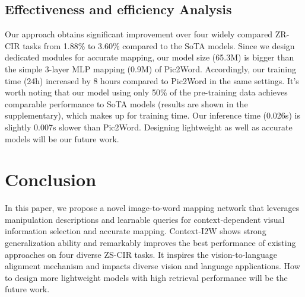 \documentclass[letterpaper]{article} \usepackage{aaai24}  \usepackage{times}  \usepackage{helvet}  \usepackage{courier}  \usepackage[hyphens]{url}  \usepackage{graphicx} \urlstyle{rm} \def\UrlFont{\rm}  \usepackage{natbib}  \usepackage{caption} \frenchspacing  \setlength{\pdfpagewidth}{8.5in} \setlength{\pdfpageheight}{11in} \usepackage{algorithm}
\begin{document}
\subsection{Effectiveness and efficiency Analysis} 
Our approach obtains significant improvement over four widely compared ZR-CIR tasks from 1.88\% to 3.60\% compared to the SoTA models. Since we design dedicated modules for accurate mapping, our model size  (65.3M) is bigger than the simple 3-layer MLP mapping (0.9M) of Pic2Word. Accordingly, our training time (24h) increased by 8 hours compared to Pic2Word in the same settings. It’s worth noting that our model using only 50\% of the pre-training data achieves comparable performance to  SoTA models (results are shown in the supplementary), which makes up for training time. Our inference time (0.026s) is slightly 0.007s slower than  Pic2Word. Designing lightweight as well as accurate models will be our future work. 

\section{Conclusion}

In this paper,  we propose a novel image-to-word mapping network that leverages manipulation descriptions and learnable queries for context-dependent visual information selection and accurate mapping. Context-I2W  shows strong generalization ability and remarkably improves the best performance of existing approaches on four diverse ZS-CIR tasks. It inspires the vision-to-language
alignment mechanism and impacts diverse vision and language applications. How to design more lightweight models with high retrieval performance will be the future work.


\end{document}
